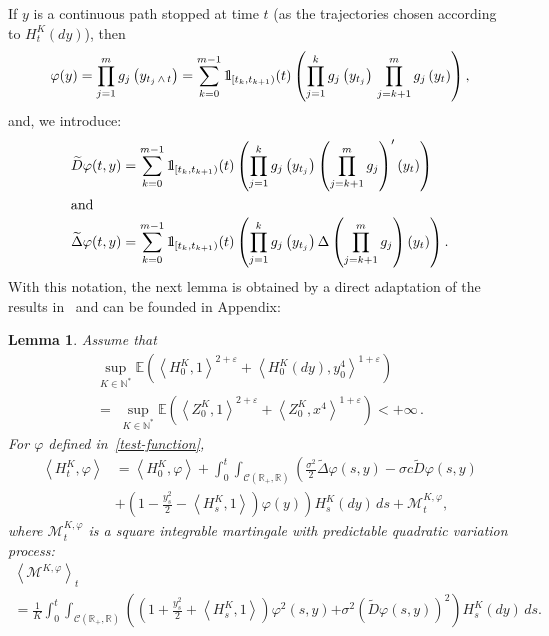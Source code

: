 \documentclass[10pt]{amsart}
\newtheorem{lemm}[theo]{Lemma}\newtheorem{prop}[theo]{Proposition}\newtheorem{coro}[theo]{Corollary}\newtheorem{conj}[theo]{Conjecture}
\theoremstyle{definition}\newtheorem{defi}[theo]{Definition}\newtheorem{rema}[theo]{Remark}\newtheorem{exam}[theo]{Example}\newtheorem{exem}[theo]{Example}\newtheorem{nota}[theo]{Notation}
\newcommand{\Co}{\mathcal{C}}
\newcommand{\Mo}{\mathcal{M}}
\newcommand*\N{\mathbb{N}}
\newcommand*\R{\mathbb{R}}
\newcommand*\E{\mathbb{E}}
\newcommand*\ind{{\mathchoice {\rm 1\mskip-4mu l} {\rm 1\mskip-4mu l} {\rm 1\mskip-4.5mu l} {\rm 1\mskip-5mu l}}}
\begin{document}
If $y$ is a continuous path stopped at time $t$ (as the trajectories chosen according to $H^K_{t}(dy)$), then
\[
\varphi(y)=\prod_{j=1}^m g_{j}\left(y_{t_{j}\,\wedge\, t} \right) = \sum_{k=0}^{m-1}\ind_{\left[t_k, t_{k+1}\right)}(t)\left(\prod_{j=1}^k g_j\left(y_{t_j}\right) \, \prod_{j=k+1}^m g_j\left(y_t\right)\right),
\]
and, we introduce:
\begin{align}
\widetilde{D}\varphi(t,y) &= \sum_{k=0}^{m-1}\ind_{\left[t_k, t_{k+1}\right)}(t)\left(\prod_{j=1}^k g_j\left(y_{t_j}\right) \left(\prod_{j=k+1}^m g_j\right)'\left(y_t\right)\right)\label{derivee}
\\
\intertext{and}
\widetilde{\Delta}\varphi(t,y) &= \sum_{k=0}^{m-1}\ind_{\left[t_k, t_{k+1}\right)}(t)\left(\prod_{j=1}^k g_j\left(y_{t_j}\right) \Delta\left(\prod_{j=k+1}^m g_j\right)\left(y_t\right)\right).\label{laplacien}
\end{align}
With this notation, the next lemma is obtained by a direct adaptation of the results in~\cite{champagnatmeleard} and can be founded in Appendix:
\begin{lemm}\label{martingale}
Assume that
\begin{multline*}
\sup_{K \in \N^{\ast}}\E\left(\left\langle H^{K}_{0},1\right\rangle^{2+\varepsilon}+\left\langle H^K_0(dy),y_0^4\right\rangle^{1+\varepsilon}\right)\\
=\; \sup_{K \in \N^{\ast}}\E\left(\left\langle Z^{K}_{0},1\right\rangle^{2+\varepsilon}+\left\langle Z^K_0,x^4\right\rangle^{1+\varepsilon}\right)<+\infty\,.
\end{multline*}
For $\varphi$ defined in~\eqref{test-function},
\begin{equation}\label{martingalecasdawson}
\begin{split}
\left\langle H^K_t,\varphi\right\rangle
&= \left\langle H^K_0,\varphi\right\rangle
+ \int_0^t \int_{\Co\left(\R_+, \R\right)} \left(
\frac{\sigma^2}{2} \widetilde{\Delta}\varphi(s,y)-\sigma c \widetilde{D}\varphi(s,y)\right.\\
&+\left. \left(1- \frac{y_s^2}{2} - \left\langle H^K_s,1\right\rangle\right)\varphi(y)\right)H^K_s(dy)\, ds + \Mo^{K, \varphi}_t,
\end{split}
\end{equation}
where $\Mo^{K,\varphi}_t$ is a square integrable martingale with predictable quadratic variation process:
\begin{multline}\label{eq:crochet}
\left\langle \Mo^{K, \varphi}\right\rangle_t\\
= \frac{1}{K} \int_0^t \int_{\Co\left(\R_+, \R\right)} \left(\left(1+ \frac{y_s^2}{2} +\left\langle H^K_s,1\right\rangle\right)\varphi^2(s,y) { + \sigma^2 \left(\widetilde{D}\varphi(s,y)\right)^2}
\right) H^K_s(dy)\, ds.
\end{multline}
\end{lemm} 
\end{document}
